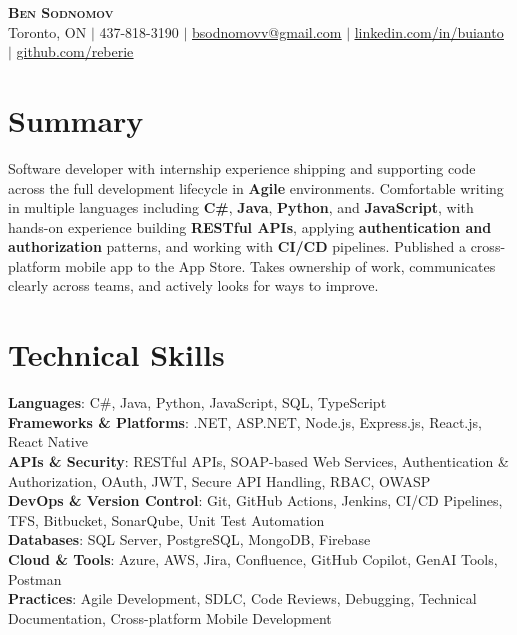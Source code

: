 \documentclass[letterpaper,11pt]{article}
\begin{document}
\begin{center}
    \textbf{\Huge \scshape Ben Sodnomov} \\ \vspace{1pt}
    \small Toronto, ON $|$ 437-818-3190 $|$ \href{mailto:bsodnomovv@gmail.com}{\underline{bsodnomovv@gmail.com}} $|$
    \href{https://www.linkedin.com/in/buianto-sodnomov-9087672ba/}{\underline{linkedin.com/in/buianto}} $|$
    \href{https://github.com/reberie}{\underline{github.com/reberie}}
\end{center}

\section{Summary}
\begin{itemize}[leftmargin=0.15in, label={}]
  \small{\item{
    Software developer with internship experience shipping and supporting code across the full development lifecycle in \textbf{Agile} environments. Comfortable writing in multiple languages including \textbf{C\#}, \textbf{Java}, \textbf{Python}, and \textbf{JavaScript}, with hands-on experience building \textbf{RESTful APIs}, applying \textbf{authentication and authorization} patterns, and working with \textbf{CI/CD} pipelines. Published a cross-platform mobile app to the App Store. Takes ownership of work, communicates clearly across teams, and actively looks for ways to improve.
  }}
\end{itemize}
\vspace{-14pt}

\section{Technical Skills}
\begin{itemize}[leftmargin=0.15in, label={}]
  \small{\item{
    \textbf{Languages}{: C\#, Java, Python, JavaScript, SQL, TypeScript} \\[1mm]
    \textbf{Frameworks \& Platforms}{: .NET, ASP.NET, Node.js, Express.js, React.js, React Native} \\[1mm]
    \textbf{APIs \& Security}{: RESTful APIs, SOAP-based Web Services, Authentication \& Authorization, OAuth, JWT, Secure API Handling, RBAC, OWASP} \\[1mm]
    \textbf{DevOps \& Version Control}{: Git, GitHub Actions, Jenkins, CI/CD Pipelines, TFS, Bitbucket, SonarQube, Unit Test Automation} \\[1mm]
    \textbf{Databases}{: SQL Server, PostgreSQL, MongoDB, Firebase} \\[1mm]
    \textbf{Cloud \& Tools}{: Azure, AWS, Jira, Confluence, GitHub Copilot, GenAI Tools, Postman} \\[1mm]
    \textbf{Practices}{: Agile Development, SDLC, Code Reviews, Debugging, Technical Documentation, Cross-platform Mobile Development}
  }}
\end{itemize}
\vspace{-14pt}
\end{document}
